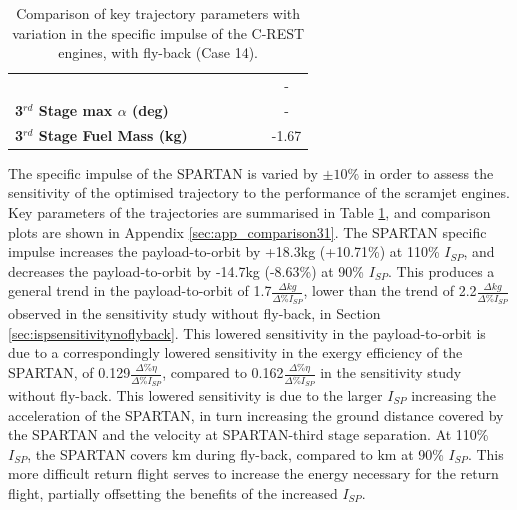 \begin{table}[ht]
\begin{tabular}{l c c c c c c}
		& \thirdqOverFiveIspNinety
		& \thirdqOverFiveIspNinetyFive
		& \thirdqOverFiveIspStandard
		& \thirdqOverFiveIspOneHundredFive
		& \thirdqOverFiveIspOneHundredTen
		& -
		\\
		\textbf{3$^{rd}$ Stage max $\alpha$ (deg)}
		& \thirdmaxAoAIspNinety
		& \thirdmaxAoAIspNinetyFive
		& \thirdmaxAoAIspStandard
		& \thirdmaxAoAIspOneHundredFive
		& \thirdmaxAoAIspOneHundredTen
		& -
		\\
		\textbf{3$^{rd}$ Stage Fuel Mass (kg)}
		& \thirdmFuelIspNinety
		& \thirdmFuelIspNinetyFive
		& \thirdmFuelIspStandard
		& \thirdmFuelIspOneHundredFive
		& \thirdmFuelIspOneHundredTen
		&-1.67
		\\
		\hline 
	\end{tabular} 
	\caption{Comparison of key trajectory parameters with variation in the specific impulse of the C-REST engines, with fly-back (Case 14).}
	\label{tab:comparison31}
\end{table}

The specific impulse of the SPARTAN is varied by $\pm10\%$ in order to assess the sensitivity of the optimised trajectory to the performance of the scramjet engines. 
Key parameters of the trajectories are summarised in Table \ref{tab:comparison31}, and comparison plots are shown in Appendix \ref{sec:app_comparison31}.
The SPARTAN specific impulse increases the payload-to-orbit by +18.3kg (+10.71\%) at 110\% $I_{SP}$, and decreases the payload-to-orbit by -14.7kg (-8.63\%) at 90\% $I_{SP}$. 
This produces a general trend in the payload-to-orbit of 1.7$\frac{\Delta kg}{\Delta \%I_{SP} }$, lower than the trend of 2.2$\frac{\Delta kg}{\Delta \%I_{SP} }$ observed in the sensitivity study without fly-back, in Section \ref{sec:ispsensitivitynoflyback}.
This lowered sensitivity in the payload-to-orbit is due to a correspondingly lowered sensitivity in the exergy efficiency of the SPARTAN, of 0.129$\frac{\Delta \% \eta}{\Delta \%I_{SP} }$, compared to 0.162$\frac{\Delta \% \eta}{\Delta \%I_{SP} }$ in the sensitivity study without fly-back. This lowered sensitivity is due to the larger $I_{SP}$ increasing the acceleration of the SPARTAN, in turn increasing the ground distance covered by the SPARTAN and the velocity at SPARTAN-third stage separation. At 110\% $I_{SP}$, the SPARTAN covers \returnDistIspOneHundredTen km during fly-back, compared to \returnDistIspNinety km at 90\% $I_{SP}$. This more difficult return flight serves to increase the energy necessary for the return flight, partially offsetting the benefits of the increased $I_{SP}$. 

